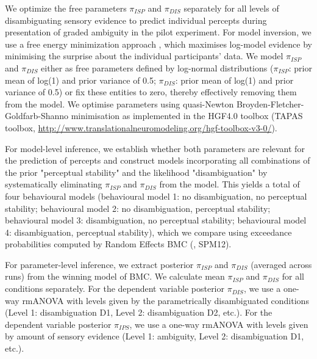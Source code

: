 \documentclass[12pt]{article}
\begin{document}
We optimize the free parameters $\pi_{ISP}$ and $\pi_{DIS}$ separately for all levels of disambiguating sensory evidence to predict individual percepts during presentation of graded ambiguity in the pilot experiment. For model inversion, we use a free energy minimization approach \parencite{Friston2007}, which maximises log-model evidence by minimising the surprise about the individual participants' data. We model $\pi_{ISP}$ and $\pi_{DIS}$ either as free parameters defined by log-normal distributions ($\pi_{ISP}$: prior mean of log(1) and prior variance of 0.5; $\pi_{DIS}$: prior mean of log(1) and prior variance of 0.5) or fix these entities to zero, thereby effectively removing them from the model. We optimise parameters using quasi-Newton Broyden-Fletcher-Goldfarb-Shanno minimisation as implemented in the HGF4.0 toolbox (TAPAS toolbox, \url{http://www.translationalneuromodeling.org/hgf-toolbox-v3-0/}).

For model-level inference, we establish whether both parameters are relevant for the prediction of percepts and construct models incorporating all combinations of the prior "perceptual stability" and the likelihood "disambiguation" by systematically eliminating $\pi_{ISP}$ and $\pi_{DIS}$ from the model. This yields a total of four behavioural models (behavioural model 1: no disambiguation, no perceptual stability; behavioural model 2: no disambiguation, perceptual stability; behavioural model 3: disambiguation, no perceptual stability; behavioural model 4: disambiguation, perceptual stability), which we compare using exceedance probabilities computed by Random Effects BMC (\cite{Stephan2009}, SPM12).

For parameter-level inference, we extract posterior $\pi_{ISP}$ and $\pi_{DIS}$ (averaged across runs) from the winning model of BMC. We calculate mean $\pi_{ISP}$ and $\pi_{DIS}$ for all conditions separately. For the dependent variable posterior $\pi_{DIS}$, we use a one-way rmANOVA with levels given by the parametrically disambiguated conditions (Level 1: disambiguation D1, Level 2: disambiguation D2, etc.). For the dependent variable posterior $\pi_{IPS}$, we use a one-way rmANOVA with levels given by amount of sensory evidence (Level 1: ambiguity, Level 2: disambiguation D1, etc.).
\end{document}
